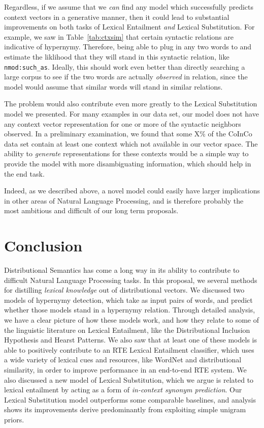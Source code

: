\documentclass[letterpaper]{article}
\begin{document}
Regardless, if we assume that we {\em can} find any model which successfully
predicts context vectors in a generative manner, then it could lead to
substantial improvements on both tasks of Lexical Entailment {\em and} Lexical
Substitution. For example, we saw in Table~\ref{tab:ctxsim} that certain
syntactic relations are indicative of hypernymy. Therefore, being able to plug
in any two words to and estimate the liklihood that they will stand in this
syntactic relation, like {\tt nmod:such\_as}. Ideally, this should work even
better than directly searching a large corpus to see if the two words are
actually {\em observed} in relation, since the model would assume that similar
words will stand in similar relations.

The problem would also contribute even more greatly to the Lexical Substitution
model we presented. For many examples in our data set, our model does not have
any context vector representation for one or more of the syntactic neighbors
observed. In a preliminary examination, we found that some X\% of the CoInCo
data set contain at least one context which not available in our vector space.
The ability to {\em generate} representations for these contexts would be
a simple way to provide the model with more disambiguating information, which
should help in the end task.

Indeed, as we described above, a novel model could easily have larger
implications in other areas of Natural Language Processing, and is therefore
probably the most ambitious and difficult of our long term proposals.

\section{Conclusion}

Distributional Semantics has come a long way in its ability to contribute to
difficult Natural Language Processing tasks. In this proposal, we several
methods for distilling {\em lexical knowledge} out of distributional vectors.
We discussed two models of hypernymy detection, which take as input pairs of
words, and predict whether those models stand in a hypernymy relation.  Through
detailed analysis, we have a clear picture of how these models work, and how
they relate to some of the linguistic literature on Lexical Entailment, like
the Distributional Inclusion Hypothesis and Hearst Patterns. We also saw that
at least one of these models is able to positively contribute to an RTE Lexical
Entailment classifier, which uses a wide variety of lexical cues and resources,
like WordNet and distributional similarity, in order to improve performance in
an end-to-end RTE system. We also discussed a new model of Lexical
Substitution, which we argue is related to lexical entailment by acting as a
form of {\em in-context synonym prediction}. Our Lexical Substitution model
outperforms some comparable baselines, and analysis shows its improvements
derive predominantly from exploiting simple unigram priors.
\end{document}
